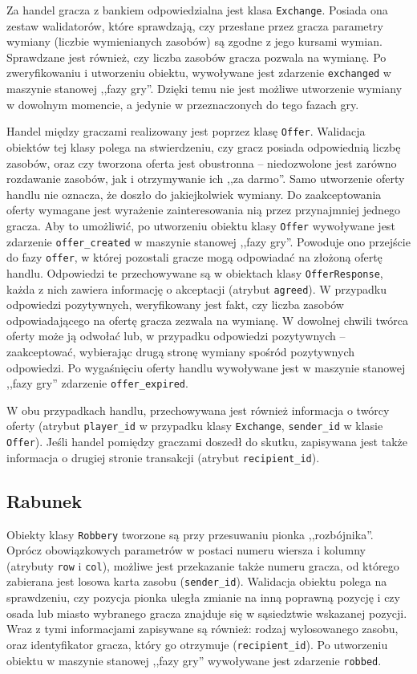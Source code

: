 \documentclass[11pt,twoside]{report}
\begin{document}
Za handel gracza z bankiem odpowiedzialna jest klasa
\texttt{Exchange}. Posiada ona zestaw walidatorów, które sprawdzają,
czy przesłane przez gracza parametry wymiany (liczbie wymienianych
zasobów) są zgodne z jego kursami wymian. Sprawdzane jest również, czy
liczba zasobów gracza pozwala na wymianę. Po zweryfikowaniu i
utworzeniu obiektu, wywoływane jest zdarzenie \texttt{exchanged} w
maszynie stanowej ,,fazy gry''. Dzięki temu nie jest możliwe
utworzenie wymiany w dowolnym momencie, a jedynie w przeznaczonych do
tego fazach gry.

Handel między graczami realizowany jest poprzez klasę
\texttt{Offer}. Walidacja obiektów tej klasy polega na stwierdzeniu,
czy gracz posiada odpowiednią liczbę zasobów, oraz czy tworzona oferta
jest obustronna -- niedozwolone jest zarówno rozdawanie zasobów, jak i
otrzymywanie ich ,,za darmo''. Samo utworzenie oferty handlu nie
oznacza, że doszło do jakiejkolwiek wymiany. Do zaakceptowania oferty
wymagane jest wyrażenie zainteresowania nią przez przynajmniej jednego
gracza. Aby to umożliwić, po utworzeniu obiektu klasy \texttt{Offer}
wywoływane jest zdarzenie \texttt{offer\_created} w maszynie stanowej
,,fazy gry''. Powoduje ono przejście do fazy \texttt{offer}, w której
pozostali gracze mogą odpowiadać na złożoną ofertę handlu. Odpowiedzi
te przechowywane są w obiektach klasy \texttt{OfferResponse}, każda z
nich zawiera informację o akceptacji (atrybut \texttt{agreed}). W
przypadku odpowiedzi pozytywnych, weryfikowany jest fakt, czy liczba
zasobów odpowiadającego na ofertę gracza zezwala na wymianę. W
dowolnej chwili twórca oferty może ją odwołać lub, w przypadku
odpowiedzi pozytywnych -- zaakceptować, wybierając drugą stronę
wymiany spośród pozytywnych odpowiedzi. Po wygaśnięciu oferty handlu
wywoływane jest w maszynie stanowej ,,fazy gry'' zdarzenie
\texttt{offer\_expired}.

W obu przypadkach handlu, przechowywana jest również informacja o
twórcy oferty (atrybut \texttt{player\_id} w przypadku klasy
\texttt{Exchange}, \texttt{sender\_id} w klasie \texttt{Offer}). Jeśli
handel pomiędzy graczami doszedł do skutku, zapisywana jest także
informacja o drugiej stronie transakcji (atrybut
\texttt{recipient\_id}).

\subsection{Rabunek}
Obiekty klasy \texttt{Robbery} tworzone są przy przesuwaniu pionka
,,rozbójnika''. Oprócz obowiązkowych parametrów w postaci numeru
wiersza i kolumny (atrybuty \texttt{row} i \texttt{col}), możliwe jest
przekazanie także numeru gracza, od którego zabierana jest losowa
karta zasobu (\texttt{sender\_id}). Walidacja obiektu polega na
sprawdzeniu, czy pozycja pionka uległa zmianie na inną poprawną
pozycję i czy osada lub miasto wybranego gracza znajduje się w
sąsiedztwie wskazanej pozycji. Wraz z tymi informacjami zapisywane są
również: rodzaj wylosowanego zasobu, oraz identyfikator gracza, który
go otrzymuje (\texttt{recipient\_id}). Po utworzeniu obiektu w
maszynie stanowej ,,fazy gry'' wywoływane jest zdarzenie
\texttt{robbed}.
\end{document}
